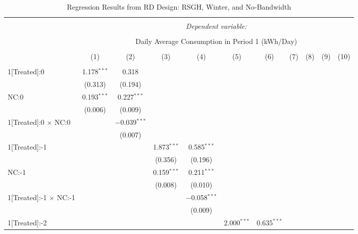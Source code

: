 \begin{table}[!htbp]
\centering 
\caption{Regression Results from RD Design: RSGH, Winter, and No-Bandwidth} 
\label{} 
\footnotesize 
\begin{adjustbox}{scale = 0.75}
\begin{tabular}{@{\extracolsep{5pt}}lcccccccccc} 
\\[-1.8ex]\hline 
\hline \\[-1.8ex] 
 & \multicolumn{10}{c}{\textit{Dependent variable:}} \\ 
\cline{2-11} 
\\[-1.8ex] & \multicolumn{10}{c}{Daily Average Consumption in Period 1 (kWh/Day)} \\ 
\\[-1.8ex] & (1) & (2) & (3) & (4) & (5) & (6) & (7) & (8) & (9) & (10)\\ 
\hline \\[-1.8ex] 
 1[Treated]:0 & 1.178$^{***}$ & 0.318 &  &  &  &  &  &  &  &  \\ 
  & (0.313) & (0.194) &  &  &  &  &  &  &  &  \\ 
 NC:0 & 0.193$^{***}$ & 0.227$^{***}$ &  &  &  &  &  &  &  &  \\ 
  & (0.006) & (0.009) &  &  &  &  &  &  &  &  \\ 
 1[Treated]:0 $\times$ NC:0 &  & $-$0.039$^{***}$ &  &  &  &  &  &  &  &  \\ 
  &  & (0.007) &  &  &  &  &  &  &  &  \\ 
 1[Treated]:-1 &  &  & 1.873$^{***}$ & 0.585$^{***}$ &  &  &  &  &  &  \\ 
  &  &  & (0.356) & (0.196) &  &  &  &  &  &  \\ 
 NC:-1 &  &  & 0.159$^{***}$ & 0.211$^{***}$ &  &  &  &  &  &  \\ 
  &  &  & (0.008) & (0.010) &  &  &  &  &  &  \\ 
 1[Treated]:-1 $\times$ NC:-1 &  &  &  & $-$0.058$^{***}$ &  &  &  &  &  &  \\ 
  &  &  &  & (0.009) &  &  &  &  &  &  \\ 
 1[Treated]:-2 &  &  &  &  & 2.000$^{***}$ & 0.635$^{***}$ &  &  &  &  \\ 

\end{tabular}
\end{adjustbox}
\end{table}
